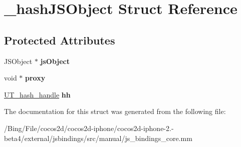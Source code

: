 \hypertarget{struct__hash_j_s_object}{\section{\-\_\-hash\-J\-S\-Object Struct Reference}
\label{struct__hash_j_s_object}
}
\subsection*{Protected Attributes}
\begin{DoxyCompactItemize}
\item 
\hypertarget{struct__hash_j_s_object_a1bf93b858fb0f2e47cd0f0cdbef3a301}{J\-S\-Object $\ast$ {\bfseries js\-Object}}\label{struct__hash_j_s_object_a1bf93b858fb0f2e47cd0f0cdbef3a301}

\item 
\hypertarget{struct__hash_j_s_object_a63554d7b80835b7232ea8b953f7e1745}{void $\ast$ {\bfseries proxy}}\label{struct__hash_j_s_object_a63554d7b80835b7232ea8b953f7e1745}

\item 
\hypertarget{struct__hash_j_s_object_a41c4ea1d6b194d0928c579214977f1ba}{\hyperlink{struct_u_t__hash__handle}{U\-T\-\_\-hash\-\_\-handle} {\bfseries hh}}\label{struct__hash_j_s_object_a41c4ea1d6b194d0928c579214977f1ba}

\end{DoxyCompactItemize}


The documentation for this struct was generated from the following file\-:\begin{DoxyCompactItemize}
\item 
/\-Bing/\-File/cocos2d/cocos2d-\/iphone/cocos2d-\/iphone-\/2.-\/beta4/external/jsbindings/src/manual/js\-\_\-bindings\-\_\-core.\-mm\end{DoxyCompactItemize}
